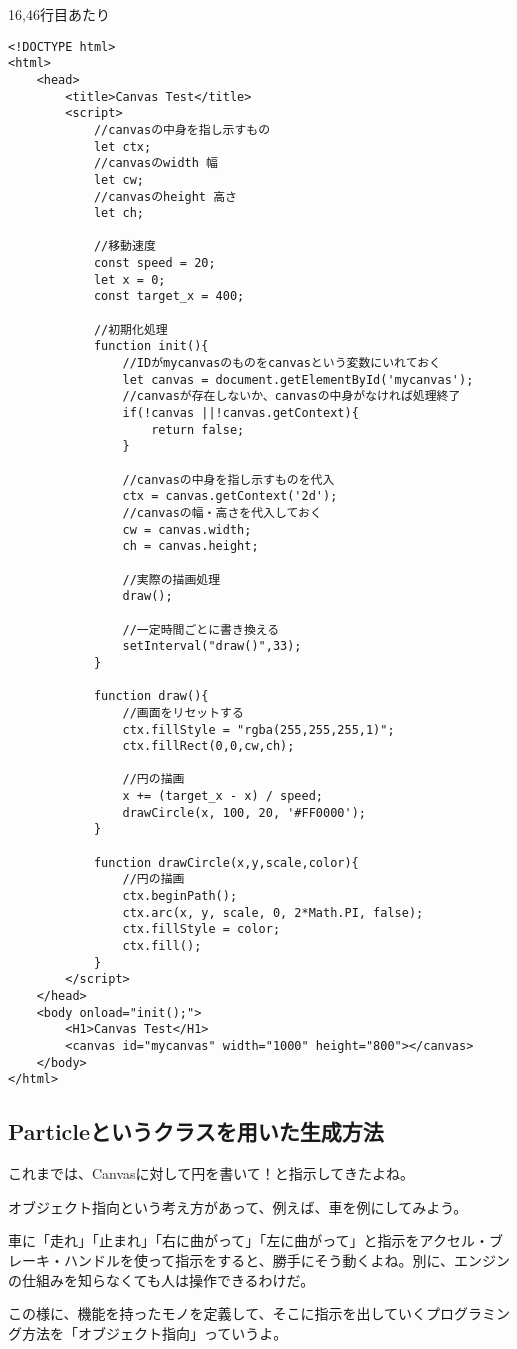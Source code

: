\documentclass[mingoth,11pt,a4j,uplatex]{jsarticle}
\begin{document}
16,46行目あたり
\begin{lstlisting}[caption=摩擦のシミュレーション]
<!DOCTYPE html>
<html>
	<head>
		<title>Canvas Test</title>
		<script>
			//canvasの中身を指し示すもの
			let ctx;
			//canvasのwidth 幅
			let cw;
			//canvasのheight 高さ
			let ch;
			
			//移動速度
			const speed = 20;
			let x = 0;
			const target_x = 400;
			
			//初期化処理
			function init(){
				//IDがmycanvasのものをcanvasという変数にいれておく
				let canvas = document.getElementById('mycanvas');
				//canvasが存在しないか、canvasの中身がなければ処理終了
				if(!canvas ||!canvas.getContext){
					return false;
				}
				
				//canvasの中身を指し示すものを代入
				ctx = canvas.getContext('2d');
				//canvasの幅・高さを代入しておく
				cw = canvas.width;
				ch = canvas.height;
				
				//実際の描画処理
				draw();
				
				//一定時間ごとに書き換える
				setInterval("draw()",33);
			}
			
			function draw(){
				//画面をリセットする
				ctx.fillStyle = "rgba(255,255,255,1)";
				ctx.fillRect(0,0,cw,ch);
				
				//円の描画
				x += (target_x - x) / speed;
				drawCircle(x, 100, 20, '#FF0000');
			}
			
			function drawCircle(x,y,scale,color){
				//円の描画
				ctx.beginPath();
				ctx.arc(x, y, scale, 0, 2*Math.PI, false);
				ctx.fillStyle = color;
				ctx.fill();
			}
		</script>
	</head>
	<body onload="init();">
		<H1>Canvas Test</H1>
		<canvas id="mycanvas" width="1000" height="800"></canvas>
	</body>
</html>
\end{lstlisting}

\subsection{Particleというクラスを用いた生成方法}
これまでは、Canvasに対して円を書いて！と指示してきたよね。

オブジェクト指向という考え方があって、例えば、車を例にしてみよう。

車に「走れ」「止まれ」「右に曲がって」「左に曲がって」と指示をアクセル・ブレーキ・ハンドルを使って指示をすると、勝手にそう動くよね。別に、エンジンの仕組みを知らなくても人は操作できるわけだ。

この様に、機能を持ったモノを定義して、そこに指示を出していくプログラミング方法を「オブジェクト指向」っていうよ。
\end{document}
